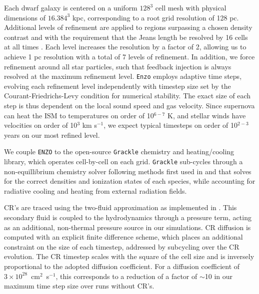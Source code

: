 \documentclass[11pt]{article}
\begin{document}
Each dwarf galaxy is centered on a uniform $128^3$ cell mesh with physical dimensions of $16.384^3$ kpc, corresponding to a root grid resolution of 128 pc. Additional levels of refinement are applied to regions surpassing a chosen density contrast and with the requirement that the Jeans length be resolved by 16 cells at all times \citep{Truelove}. Each level increases the resolution by a factor of 2, allowing us to achieve 1 pc resolution with a total of 7 levels of refinement. In addition, we force refinement around all star particles, such that feedback injection is always resolved at the maximum refinement level. \texttt{Enzo} employs adaptive time steps, evolving each refinement level independently with timestep size set by the Courant-Friedrichs-Levy condition for numerical stability. The exact size of each step is thus dependent on the local sound speed and gas velocity. Since supernova can heat the ISM to temperatures on order of 10$^{6-7}$ K, and stellar winds have velocities on order of 10$^{3}$ km s$^{-1}$, we expect typical timesteps on order of 10$^{2-3}$ years on our most refined level.

We couple \texttt{ENZO} to the open-source \texttt{Grackle} chemistry and heating/cooling library, which operates cell-by-cell on each grid. \texttt{Grackle} sub-cycles through a non-equillibrium chemistry solver following methods first used in \cite{Anninos1997} and \cite{Abel1997} that solves for the correct densities and ionization states of each species, while accounting for radiative cooling and heating from external radiation fields.

CR's are traced using the two-fluid approximation as implemented in \cite{SalemBryan2014}. This secondary fluid is coupled to the hydrodynamics through a pressure term, acting as an additional, non-thermal pressure source in our simulations. CR diffusion is computed with an explicit finite difference scheme, which places an additional constraint on the size of each timestep, addressed by subcycling over the CR evolution. The CR timestep scales with the square of the cell size and is inversely proportional to the adopted diffusion coefficient. For a diffusion coefficient of $3\times10^{28}$~cm$^{2}$~s$^{-1}$, this corresponds to a reduction of a factor of $\sim$10 in our maximum time step size over runs without CR's.
\end{document}

